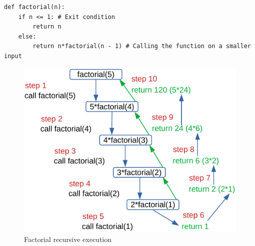 \begin{lstlisting}[firstnumber=1, caption={Implementation of calculating the factorial of a number using the recursive way.}]
def factorial(n):
	if n <= 1: # Exit condition
		return n
	else: 
		return n*factorial(n - 1) # Calling the function on a smaller input
\end{lstlisting}

\begin{figure}[hb]
	\begin{center}
		\includegraphics[scale=.6]{chapters/introduction/images/factorial.pdf}
		\caption[Factorial recursive execution]{Factorial recursive execution}
		\label{fig:factorial_1}
	\end{center}
\end{figure}